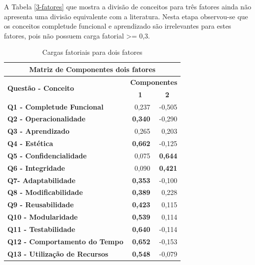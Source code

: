 \begin{apendicesenv}
 
 A Tabela \ref{3-fatores} que mostra a divisão de conceitos para três fatores ainda não apresenta uma divisão equivalente com a literatura. Nesta etapa observou-se que os conceitos completude funcional e aprendizado são irrelevantes para estes fatores, pois não possuem carga fatorial >= 0,3.
 

 
       \begin{longtable}{rrr}
       \caption{Cargas fatoriais para dois fatores}
               \label{2-fatores}
       \\\hline
       \multicolumn{3}{c}{\textbf{Matriz de Componentes dois fatores}} \\
       \hline
       \multicolumn{1}{l}{\multirow{2}[2]{*}{\textbf{Questão - Conceito}}} & \multicolumn{2}{c}{\textbf{Componentes}} \\
       \multicolumn{1}{l}{} & \multicolumn{1}{c}{\textbf{1}} & \multicolumn{1}{c}{\textbf{2}} \\
       \multicolumn{1}{l}{\textbf{Q1 - Completude Funcional}} & 0,237  & -0,505 \\
       \multicolumn{1}{l}{\textbf{Q2 - Operacionalidade}} & \textbf{0,340} & -0,290 \\
       \multicolumn{1}{l}{\textbf{Q3 - Aprendizado}} & 0,265  & 0,203 \\
       \multicolumn{1}{l}{\textbf{Q4 - Estética}} & \textbf{0,662} & -0,125 \\
       \multicolumn{1}{l}{\textbf{Q5 - Confidencialidade}} & 0,075  & \textbf{0,644} \\
       \multicolumn{1}{l}{\textbf{Q6 - Integridade}} & 0,090  & \textbf{0,421} \\
       \multicolumn{1}{l}{\textbf{Q7- Adaptabilidade}} & \textbf{0,353} & -0,100 \\
       \multicolumn{1}{l}{\textbf{Q8 - Modificabilidade}} & \textbf{0,389} & 0,228 \\
       \multicolumn{1}{l}{\textbf{Q9 - Reusabilidade}} & \textbf{0,423} & 0,115 \\
       \multicolumn{1}{l}{\textbf{Q10 - Modularidade}} & \textbf{0,539} & 0,114 \\
       \multicolumn{1}{l}{\textbf{Q11 - Testabilidade}} & \textbf{0,640} & -0,114 \\
       \multicolumn{1}{l}{\textbf{Q12 - Comportamento do Tempo}} & \textbf{0,652} & -0,153 \\
       \multicolumn{1}{l}{\textbf{Q13 - Utilização de Recursos}} & \textbf{0,548} & -0,079 \\

\end{longtable}
\end{apendicesenv}
